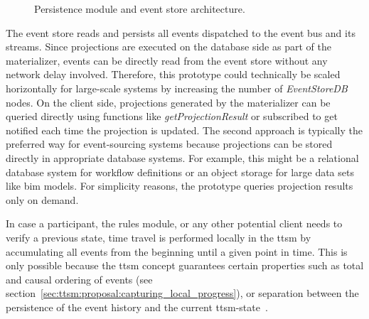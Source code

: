 \begin{figure}[h]
    \caption{Persistence module and event store architecture.}
    \label{fig:ttsm:prototype:persistence_module_architecture}
\end{figure}

The event store reads and persists all events dispatched to the event bus and its streams. Since projections are executed on the database side as part of the materializer, events can be directly read from the event store without any network delay involved. Therefore, this prototype could technically be scaled horizontally for large-scale systems by increasing the number of \textit{EventStoreDB} nodes. On the client side, projections generated by the materializer can be queried directly using functions like \textit{getProjectionResult} or subscribed to get notified each time the projection is updated. The second approach is typically the preferred way for event-sourcing systems because projections can be stored directly in appropriate database systems. For example, this might be a relational database system for workflow definitions or an object storage for large data sets like \gls{bim} models. For simplicity reasons, the prototype queries projection results only on demand.

In case a participant, the rules module, or any other potential client needs to verify a previous state, time travel is performed locally in the \gls{ttsm} by accumulating all events from the beginning until a given point in time. This is only possible because the \gls{ttsm} concept guarantees certain properties such as total and causal ordering of events (see section~\ref{sec:ttsm:proposal:capturing_local_progress}), or separation between the persistence of the event history and the current \gls{ttsm}-state~\cite{mistakes_in_event_sourcing}.


